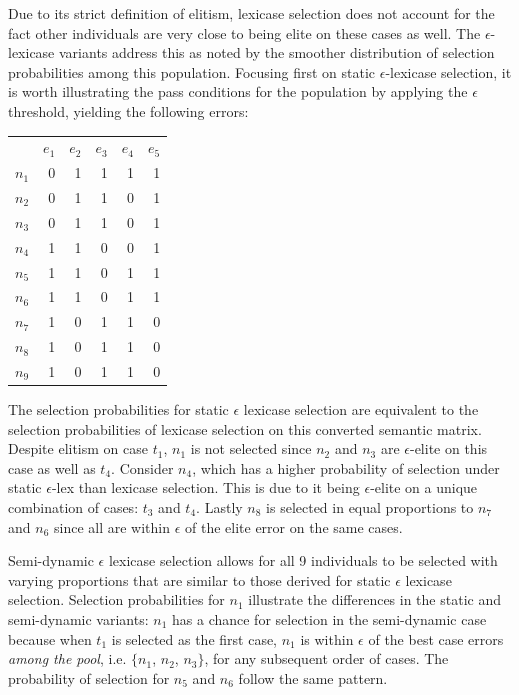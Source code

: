 \documentclass[twoside]{article}
\begin{document}
Due to its strict definition of elitism, lexicase selection does not account for the fact other individuals are very close to being elite on these cases as well. The $\epsilon$-lexicase variants address this as noted by the smoother distribution of selection probabilities among this population. Focusing first on static $\epsilon$-lexicase selection, it is worth illustrating the pass conditions for the population by applying the $\epsilon$ threshold, yielding the following errors:

\begin{center}
\begin{tabular}{lrrrrr}
& $e_1$ & $e_2$ & $e_3$ & $e_4$ & $e_5$ \\
$n_1$	&0	&	1	&	1	&	1	&	1\\ 
$n_2$	&0	&	1	&	1	&	0	&	1\\ 
$n_3$	&0	&	1	&	1	&	0	&	1\\ 
$n_4$	&1	&	1	&	0	&	0	&	1\\ 
$n_5$	&1	&	1	&	0	&	1	&	1\\ 
$n_6$	&1	&	1	&	0	&	1	&	1\\ 
$n_7$	&1	&	0	&	1	&	1	&	0\\ 
$n_8$	&1	&	0	&	1	&	1	&	0\\ 
$n_9$	&1	&	0	&	1	&	1	&	0\\ 
\end{tabular}
\end{center}
 
The selection probabilities for static $\epsilon$ lexicase selection are equivalent to the selection probabilities of lexicase selection on this converted semantic matrix. Despite elitism on case $t_1$, $n_1$ is not selected since $n_2$ and $n_3$ are $\epsilon$-elite on this case as well as $t_4$. Consider $n_4$, which has a higher probability of selection under static $\epsilon$-lex than lexicase selection. This is due to it being $\epsilon$-elite on a unique combination of cases: $t_3$ and $t_4$. Lastly $n_8$ is selected in equal proportions to $n_7$ and $n_6$ since all are within $\epsilon$ of the elite error on the same cases. 

Semi-dynamic $\epsilon$ lexicase selection allows for all 9 individuals to be selected with varying proportions that are similar to those derived for static $\epsilon$ lexicase selection. Selection probabilities for $n_1$ illustrate the differences in the static and semi-dynamic variants: $n_1$ has a chance for selection in the semi-dynamic case because when $t_1$ is selected as the first case, $n_1$ is within $\epsilon$ of the best case errors {\it among the pool}, i.e. $\{n_1$, $n_2$, $n_3\}$, for any subsequent order of cases. The probability of selection for $n_5$ and $n_6$ follow the same pattern.
\end{document}
